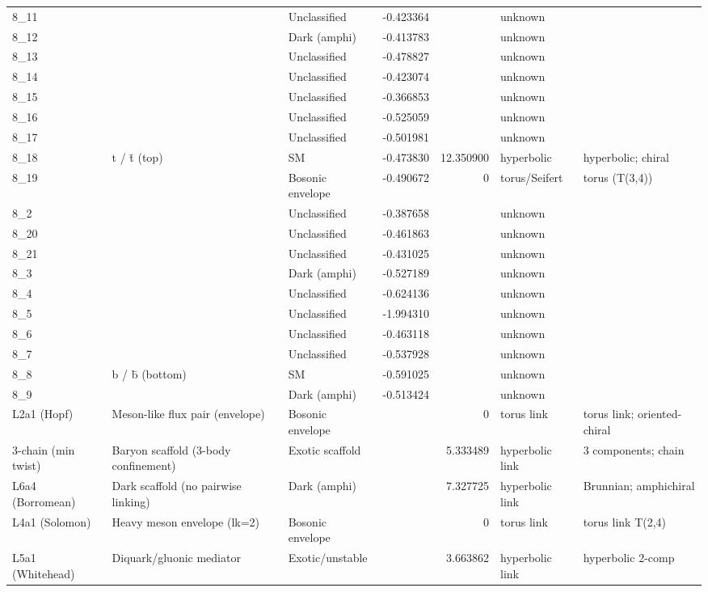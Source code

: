 \begin{table}[h!]
\begin{tabular}{llllrll}
8\_11 &  & Unclassified & -0.423364 &  & unknown &  \\
8\_12 &  & Dark (amphi) & -0.413783 &  & unknown &  \\
8\_13 &  & Unclassified & -0.478827 &  & unknown &  \\
8\_14 &  & Unclassified & -0.423074 &  & unknown &  \\
8\_15 &  & Unclassified & -0.366853 &  & unknown &  \\
8\_16 &  & Unclassified & -0.525059 &  & unknown &  \\
8\_17 &  & Unclassified & -0.501981 &  & unknown &  \\
8\_18 & t / t̄ (top) & SM & -0.473830 & 12.350900 & hyperbolic & hyperbolic; chiral \\
8\_19 &  & Bosonic envelope & -0.490672 & 0 & torus/Seifert & torus (T(3,4)) \\
8\_2 &  & Unclassified & -0.387658 &  & unknown &  \\
8\_20 &  & Unclassified & -0.461863 &  & unknown &  \\
8\_21 &  & Unclassified & -0.431025 &  & unknown &  \\
8\_3 &  & Dark (amphi) & -0.527189 &  & unknown &  \\
8\_4 &  & Unclassified & -0.624136 &  & unknown &  \\
8\_5 &  & Unclassified & -1.994310 &  & unknown &  \\
8\_6 &  & Unclassified & -0.463118 &  & unknown &  \\
8\_7 &  & Unclassified & -0.537928 &  & unknown &  \\
8\_8 & b / b̄ (bottom) & SM & -0.591025 &  & unknown &  \\
8\_9 &  & Dark (amphi) & -0.513424 &  & unknown &  \\
L2a1 (Hopf) & Meson-like flux pair (envelope) & Bosonic envelope &  & 0 & torus link & torus link; oriented-chiral \\
3-chain (min twist) & Baryon scaffold (3-body confinement) & Exotic scaffold &  & 5.333489 & hyperbolic link & 3 components; chain \\
L6a4 (Borromean) & Dark scaffold (no pairwise linking) & Dark (amphi) &  & 7.327725 & hyperbolic link & Brunnian; amphichiral \\
L4a1 (Solomon) & Heavy meson envelope (lk=2) & Bosonic envelope &  & 0 & torus link & torus link T(2,4) \\
L5a1 (Whitehead) & Diquark/gluonic mediator & Exotic/unstable &  & 3.663862 & hyperbolic link & hyperbolic 2-comp \\
\bottomrule
\end{tabular}
\end{table}